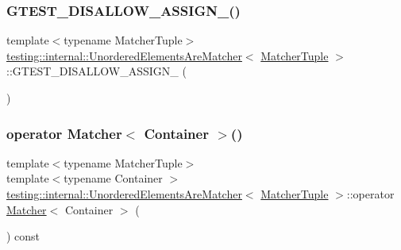 \subsubsection{\texorpdfstring{G\+T\+E\+S\+T\+\_\+\+D\+I\+S\+A\+L\+L\+O\+W\+\_\+\+A\+S\+S\+I\+G\+N\+\_\+()}{GTEST\_DISALLOW\_ASSIGN\_()}}
{\footnotesize\ttfamily template$<$typename Matcher\+Tuple$>$ \\
\hyperlink{classtesting_1_1internal_1_1UnorderedElementsAreMatcher}{testing\+::internal\+::\+Unordered\+Elements\+Are\+Matcher}$<$ \hyperlink{structtesting_1_1internal_1_1MatcherTuple}{Matcher\+Tuple} $>$\+::G\+T\+E\+S\+T\+\_\+\+D\+I\+S\+A\+L\+L\+O\+W\+\_\+\+A\+S\+S\+I\+G\+N\+\_\+ (\begin{DoxyParamCaption}\item[{\hyperlink{classtesting_1_1internal_1_1UnorderedElementsAreMatcher}{Unordered\+Elements\+Are\+Matcher}$<$ \hyperlink{structtesting_1_1internal_1_1MatcherTuple}{Matcher\+Tuple} $>$}]{ }\end{DoxyParamCaption})\hspace{0.3cm}{\ttfamily [private]}}

\mbox{\label{classtesting_1_1internal_1_1UnorderedElementsAreMatcher_a5191cb321191985e257225b9a5df95f5}} 
\subsubsection{\texorpdfstring{operator Matcher$<$ Container $>$()}{operator Matcher< Container >()}}
{\footnotesize\ttfamily template$<$typename Matcher\+Tuple$>$ \\
template$<$typename Container $>$ \\
\hyperlink{classtesting_1_1internal_1_1UnorderedElementsAreMatcher}{testing\+::internal\+::\+Unordered\+Elements\+Are\+Matcher}$<$ \hyperlink{structtesting_1_1internal_1_1MatcherTuple}{Matcher\+Tuple} $>$\+::operator \hyperlink{classtesting_1_1Matcher}{Matcher}$<$ Container $>$ (\begin{DoxyParamCaption}{ }\end{DoxyParamCaption}) const\hspace{0.3cm}{\ttfamily [inline]}}



